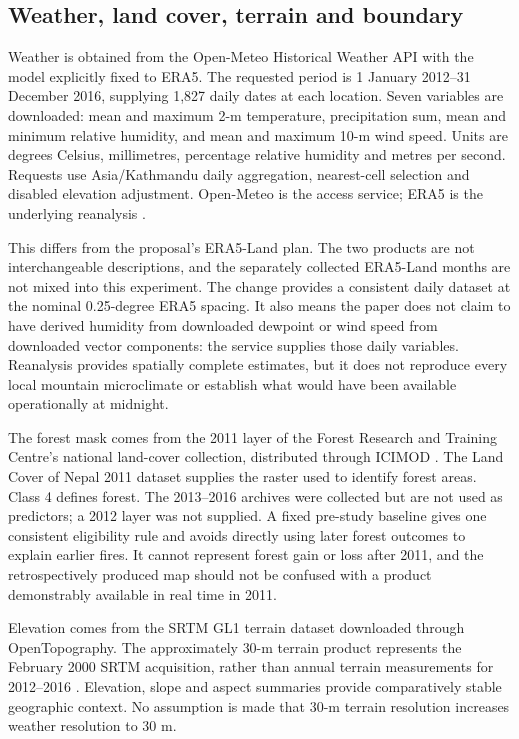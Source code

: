 \documentclass[conference,a4paper]{IEEEtran}
\begin{document}
\subsection{Weather, land cover, terrain and boundary}
Weather is obtained from the Open-Meteo Historical Weather API with the model explicitly fixed to ERA5. The requested period is 1 January 2012--31 December 2016, supplying 1,827 daily dates at each location. Seven variables are downloaded: mean and maximum 2-m temperature, precipitation sum, mean and minimum relative humidity, and mean and maximum 10-m wind speed. Units are degrees Celsius, millimetres, percentage relative humidity and metres per second. Requests use Asia/Kathmandu daily aggregation, nearest-cell selection and disabled elevation adjustment. Open-Meteo is the access service; ERA5 is the underlying reanalysis \citep{openmeteo,hersbach}.

This differs from the proposal's ERA5-Land plan. The two products are not interchangeable descriptions, and the separately collected ERA5-Land months are not mixed into this experiment. The change provides a consistent daily dataset at the nominal 0.25-degree ERA5 spacing. It also means the paper does not claim to have derived humidity from downloaded dewpoint or wind speed from downloaded vector components: the service supplies those daily variables. Reanalysis provides spatially complete estimates, but it does not reproduce every local mountain microclimate or establish what would have been available operationally at midnight.

The forest mask comes from the 2011 layer of the Forest Research and Training Centre's national land-cover collection, distributed through ICIMOD \citep{frtc}. The Land Cover of Nepal 2011 dataset supplies the raster used to identify forest areas. Class 4 defines forest. The 2013--2016 archives were collected but are not used as predictors; a 2012 layer was not supplied. A fixed pre-study baseline gives one consistent eligibility rule and avoids directly using later forest outcomes to explain earlier fires. It cannot represent forest gain or loss after 2011, and the retrospectively produced map should not be confused with a product demonstrably available in real time in 2011.

Elevation comes from the SRTM GL1 terrain dataset downloaded through OpenTopography. The approximately 30-m terrain product represents the February 2000 SRTM acquisition, rather than annual terrain measurements for 2012--2016 \citep{srtm}. Elevation, slope and aspect summaries provide comparatively stable geographic context. No assumption is made that 30-m terrain resolution increases weather resolution to 30 m.
\end{document}
